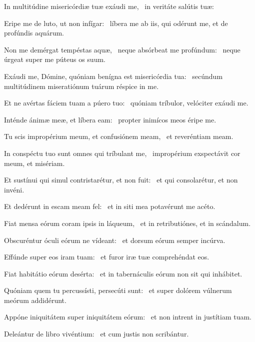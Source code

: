 
\item In multitúdine misericórdiæ tuæ exáudi me,~\psstar{} in veritáte salútis tuæ:

\item Eripe me de luto, ut non infígar:~\psstar{} líbera me ab iis, qui odérunt me, et de profúndis aquárum.

\item Non me demérgat tempéstas aquæ,~\pscross{} neque absórbeat me profúndum:~\psstar{} neque úrgeat super me púteus os suum.

\item Exáudi me, Dómine, quóniam benígna est misericórdia tua:~\psstar{} secúndum multitúdinem miseratiónum tuárum réspice in me.

\item Et ne avértas fáciem tuam a púero tuo:~\psstar{} quóniam tríbulor, velóciter exáudi me.

\item Inténde ánimæ meæ, et líbera eam:~\psstar{} propter inimícos meos éripe me.

\item Tu scis impropérium meum, et confusiónem meam,~\psstar{} et reveréntiam meam.

\item In conspéctu tuo sunt omnes qui tríbulant me,~\psstar{} impropérium exspectávit cor meum, et misériam.

\item Et sustínui qui simul contristarétur, et non fuit:~\psstar{} et qui consolarétur, et non invéni.

\item Et dedérunt in escam meam fel:~\psstar{} et in siti mea potavérunt me acéto.

\item Fiat mensa eórum coram ipsis in láqueum,~\psstar{} et in retributiónes, et in scándalum.

\item Obscuréntur óculi eórum ne vídeant:~\psstar{} et dorsum eórum semper incúrva.

\item Effúnde super eos iram tuam:~\psstar{} et furor iræ tuæ comprehéndat eos.

\item Fiat habitátio eórum desérta:~\psstar{} et in tabernáculis eórum non sit qui inhábitet.

\item Quóniam quem tu percussísti, persecúti sunt:~\psstar{} et super dolórem vúlnerum meórum addidérunt.

\item Appóne iniquitátem super iniquitátem eórum:~\psstar{} et non intrent in justítiam tuam.

\item Deleántur de libro vivéntium:~\psstar{} et cum justis non scribántur.
